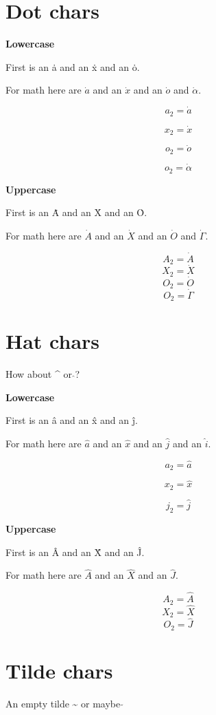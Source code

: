 \documentclass{article}
\begin{document}
\section{Dot chars}
\textbf{Lowercase}

First is an \.{a} and an \.{x} and an \.{o}.

For math here are $\dot{a}$ and an $\dot{x}$ and an $\dot{o}$ and $\dot{\alpha}$.

$$a_2=\dot{a}$$

$$x_2=\dot{x}$$

$$o_2=\dot{o}$$

$$o_2=\dot{\alpha}$$


\textbf{Uppercase}

First is an \.{A} and an \.{X} and an \.{O}.

For math here are $\dot{A}$ and an $\dot{X}$ and an $\dot{O}$ and $\dot{\Gamma}$.

$$A_2=\dot{A}$$
$$X_2=\dot{X}$$
$$O_2=\dot{O}$$
$$O_2=\dot{\Gamma}$$




\section{Hat chars}

How about \^{} or $\hat{}$? 

\textbf{Lowercase}

First is an \^{a} and an \^{x} and an \^{j}.

For math here are $\hat{a}$ and an $\hat{x}$ and an $\hat{j}$ and an $\hat{i}$.

$$a_2=\hat{a}$$

$$x_2=\hat{x}$$

$$j_2=\hat{j}$$

\textbf{Uppercase}

First is an \^{A} and an \^{X} and an \^{J}.

For math here are $\hat{A}$ and an $\hat{X}$ and an $\hat{J}$.

$$A_2=\hat{A}$$
$$X_2=\hat{X}$$
$$O_2=\hat{J}$$




\section{Tilde chars}

An empty tilde \~{} or maybe $\tilde{}$
\end{document}
